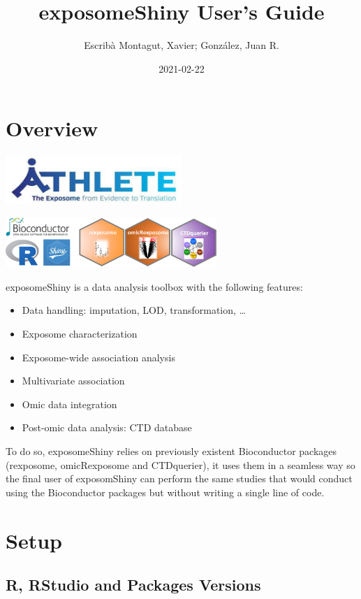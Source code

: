\documentclass[
]{book}
\title{exposomeShiny User's Guide}
\author{Escribà Montagut, Xavier; González, Juan R.}
\date{2021-02-22}
\providecommand{\tightlist}{%
  \setlength{\itemsep}{0pt}\setlength{\parskip}{0pt}}
\begin{document}
\maketitle

{
\setcounter{tocdepth}{1}
\tableofcontents
}
\hypertarget{overview}{%
\chapter{Overview}\label{overview}}

\includegraphics[width=0.5\textwidth,height=\textheight]{images/athlete.png}

\includegraphics[width=0.6\textwidth,height=\textheight]{images/logo.png}

exposomeShiny is a data analysis toolbox with the following features:

\begin{itemize}
\tightlist
\item
  Data handling: imputation, LOD, transformation, \ldots{}
\item
  Exposome characterization
\item
  Exposome-wide association analysis
\item
  Multivariate association
\item
  Omic data integration
\item
  Post-omic data analysis: CTD database
\end{itemize}

To do so, exposomeShiny relies on previously existent Bioconductor packages (rexposome, omicRexposome and CTDquerier), it uses them in a seamless way so the final user of exposomShiny can perform the same studies that would conduct using the Bioconductor packages but without writing a single line of code.

\hypertarget{setup}{%
\chapter{Setup}\label{setup}}

\hypertarget{r-rstudio-and-packages-versions}{%
\section{R, RStudio and Packages Versions}\label{r-rstudio-and-packages-versions}}
\end{document}

